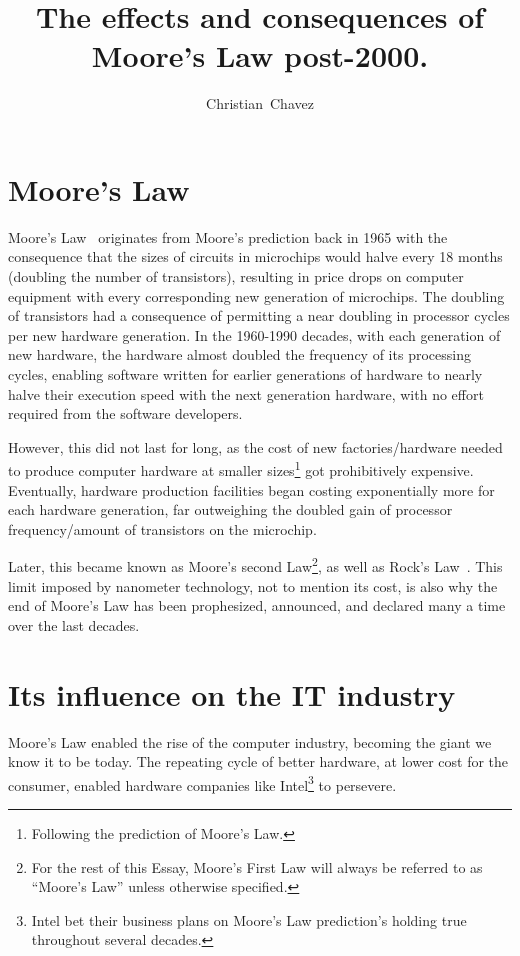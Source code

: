 \documentclass[a4paper,12pt]{article}
\begin{document}
\title{The effects and consequences of Moore's Law post-2000.}
\author{Christian~Chavez}

\maketitle

\section*{Moore's Law}

Moore's Law~\cite{Moore:2000:CMC:333067.333074} originates from Moore's prediction back in 1965 with the consequence that the sizes of circuits in microchips would halve every 18 months (doubling the number of transistors), resulting in price drops on computer equipment with every corresponding new generation of microchips.
The doubling of transistors had a consequence of permitting a near doubling in processor cycles per new hardware generation.
In the 1960-1990 decades, with each generation of new hardware, the hardware almost doubled the frequency of its processing cycles, enabling software written for earlier generations of hardware to nearly halve their execution speed with the next generation hardware, with no effort required from the software developers.

However, this did not last for long, as the cost of new factories/hardware needed to produce computer hardware at smaller sizes\footnote{Following the prediction of Moore's Law.} got prohibitively expensive.
Eventually, hardware production facilities began costing exponentially more for each hardware generation, far outweighing the doubled gain of processor frequency/amount of transistors on the microchip.

Later, this became known as Moore's second Law\footnote{For the rest of this Essay, Moore's First Law will always be referred to as ``Moore's Law'' unless otherwise specified.}, as well as Rock's Law~\cite{Ross:2003:EC:965307.965316}.
This limit imposed by nanometer technology, not to mention its cost, is also why the end of Moore's Law has been prophesized, announced, and declared many a time over the last decades.

\section*{Its influence on the IT industry}

Moore's Law enabled the rise of the computer industry, becoming the giant we know it to be today.
The repeating cycle of better hardware, at lower cost for the consumer, enabled hardware companies like Intel\footnote{Intel bet their business plans on Moore's Law prediction's holding true throughout several decades\cite{IntelMoore'sLawIn10nm,Moore40,Moore50}.} to persevere.
\end{document}

